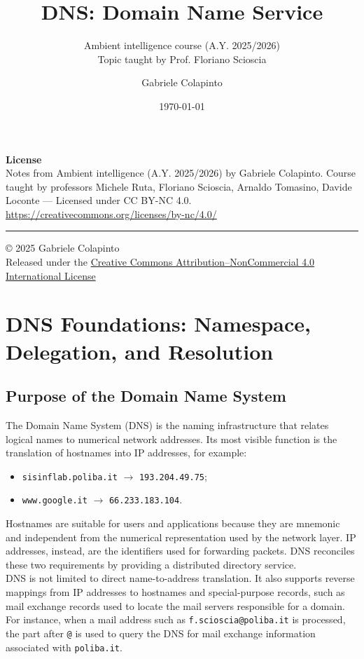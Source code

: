 \documentclass{scrbook}
\title{DNS: Domain Name Service}
\subtitle{Ambient intelligence course (A.Y. 2025/2026)\\Topic taught by Prof. Floriano Scioscia}
\author{Gabriele Colapinto}
\date{\today}
\begin{document}
	
	\maketitle
	\thispagestyle{empty}
	
	{\Large\textbf{License}} \\
	{Notes from Ambient intelligence (A.Y. 2025/2026) by Gabriele Colapinto. 
		Course taught by professors Michele Ruta, Floriano Scioscia, Arnaldo Tomasino, Davide Loconte — 
		Licensed under CC BY-NC 4.0.\\
		\url{https://creativecommons.org/licenses/by-nc/4.0/}}
	
	\vspace*{\fill}
	\rule{\textwidth}{0.2pt}
	\small{© 2025 Gabriele Colapinto \\
		Released under the \href{https://creativecommons.org/licenses/by-nc/4.0/}{Creative Commons Attribution–NonCommercial 4.0 International License}}
	
	\clearpage
	
	\tableofcontents

	\chapter{DNS Foundations: Namespace, Delegation, and Resolution}
	
	\section{Purpose of the Domain Name System}
	
	The Domain Name System (DNS) is the naming infrastructure that relates logical names to numerical network addresses. Its most visible function is the translation of hostnames into IP addresses, for example:
	\begin{itemize}
	    \item \texttt{sisinflab.poliba.it} $\rightarrow$ \texttt{193.204.49.75};
	    \item \texttt{www.google.it} $\rightarrow$ \texttt{66.233.183.104}.
	\end{itemize}
	Hostnames are suitable for users and applications because they are mnemonic and independent from the numerical representation used by the network layer. IP addresses, instead, are the identifiers used for forwarding packets. DNS reconciles these two requirements by providing a distributed directory service.\\
	
	DNS is not limited to direct name-to-address translation. It also supports reverse mappings from IP addresses to hostnames and special-purpose records, such as mail exchange records used to locate the mail servers responsible for a domain. For instance, when a mail address such as \texttt{f.scioscia@poliba.it} is processed, the part after \texttt{@} is used to query the DNS for mail exchange information associated with \texttt{poliba.it}.\\
	
\end{document}
